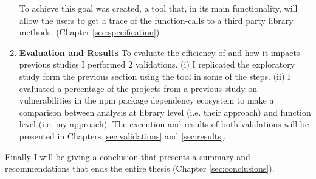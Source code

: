 \begin{enumerate}
    To achieve this goal \tool[] was created,
    a tool that, in its main functionality, will allow the users to get a trace of the function-calls to a third party library methods.
    (Chapter \ref{sec:specification})
    \item \textbf{Evaluation and Results} 
    To evaluate the efficiency of \tool[] and how it impacts previous studies I performed 2 validations. (i) I replicated the exploratory study form the previous section using the tool in some of the steps.
    (ii) I evaluated a percentage of the projects from a previous study on vulnerabilities in the npm package dependency ecosystem \cite{decan2018impact} to make a comparison between analysis at library level (i.e. their approach) and function level (i.e. my approach).
    The execution and results of both validations will be presented in Chapters \ref{sec:validations} and \ref{sec:results}.
\end{enumerate}


Finally I will be giving a conclusion that presents a summary and recommendations that ends the entire thesis (Chapter \ref{sec:conclusions}).